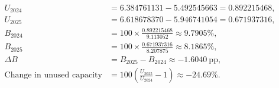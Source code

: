 \begin{align*}
U_{2024} &= 6.384761131-5.492545663=0.892215468, \\
U_{2025} &= 6.618678370-5.946741054=0.671937316, \\
B_{2024} &=100\times\frac{0.892215468}{9.113052}\approx 9.7905\%, \\
B_{2025} &=100\times\frac{0.671937316}{8.207875}\approx 8.1865\%, \\
\Delta B &= B_{2025}-B_{2024}\approx -1.6040\ \mathrm{pp}, \\
\text{Change in unused capacity} &=100\left(\frac{U_{2025}}{U_{2024}}-1\right)\approx -24.69\%.
\end{align*}
